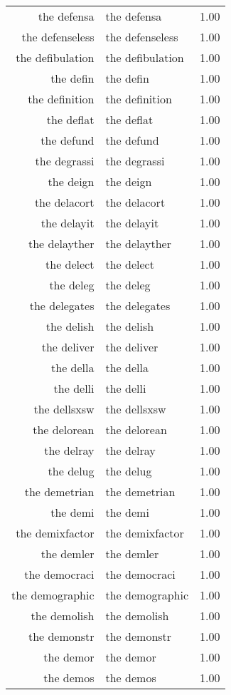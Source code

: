 \begin{table}[ht]
\begin{tabular}{rlr}
  the defensa & the defensa & 1.00 \\ 
  the defenseless & the defenseless & 1.00 \\ 
  the defibulation & the defibulation & 1.00 \\ 
  the defin & the defin & 1.00 \\ 
  the definition & the definition & 1.00 \\ 
  the deflat & the deflat & 1.00 \\ 
  the defund & the defund & 1.00 \\ 
  the degrassi & the degrassi & 1.00 \\ 
  the deign & the deign & 1.00 \\ 
  the delacort & the delacort & 1.00 \\ 
  the delayit & the delayit & 1.00 \\ 
  the delayther & the delayther & 1.00 \\ 
  the delect & the delect & 1.00 \\ 
  the deleg & the deleg & 1.00 \\ 
  the delegates & the delegates & 1.00 \\ 
  the delish & the delish & 1.00 \\ 
  the deliver & the deliver & 1.00 \\ 
  the della & the della & 1.00 \\ 
  the delli & the delli & 1.00 \\ 
  the dellsxsw & the dellsxsw & 1.00 \\ 
  the delorean & the delorean & 1.00 \\ 
  the delray & the delray & 1.00 \\ 
  the delug & the delug & 1.00 \\ 
  the demetrian & the demetrian & 1.00 \\ 
  the demi & the demi & 1.00 \\ 
  the demixfactor & the demixfactor & 1.00 \\ 
  the demler & the demler & 1.00 \\ 
  the democraci & the democraci & 1.00 \\ 
  the demographic & the demographic & 1.00 \\ 
  the demolish & the demolish & 1.00 \\ 
  the demonstr & the demonstr & 1.00 \\ 
  the demor & the demor & 1.00 \\ 
  the demos & the demos & 1.00 \\ 

\end{tabular}
\end{table}
